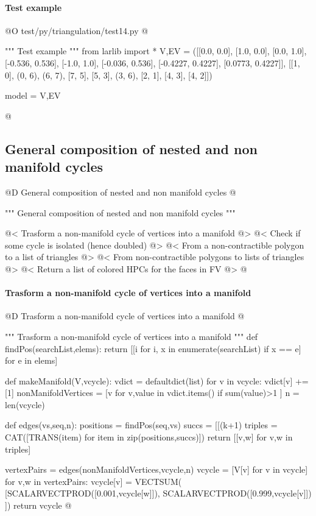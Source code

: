 \documentclass[11pt,oneside]{article}    %
\begin{document}
\paragraph{Test example}
@O test/py/triangulation/test14.py 
@{""" Test example """    
from larlib import *
V,EV = ([[0.0, 0.0],
  [1.0, 0.0],
  [0.0, 1.0],
  [-0.536, 0.536],
  [-1.0, 1.0],
  [-0.036, 0.536],
  [-0.4227, 0.4227],
  [0.0773, 0.4227]],
 [[1, 0], (0, 6), (6, 7), [7, 5], [5, 3], (3, 6), [2, 1], [4, 3], [4, 2]])
 
model = V,EV

@}




\subsection{General composition of nested and non manifold cycles}
@D General composition of nested and non manifold cycles 
@{""" General composition of nested and non manifold cycles """

@< Trasform a non-manifold cycle of vertices into a manifold  @>
@< Check if some cycle is isolated (hence doubled) @>
@< From a non-contractible polygon to a list of triangles @>
@< From non-contractible polygons to lists of triangles @>
@< Return a list of colored HPCs for the faces in FV @>
@}


\paragraph{Trasform a non-manifold cycle of vertices into a manifold}
@D Trasform a non-manifold cycle of vertices into a manifold 
@{""" Trasform a non-manifold cycle of vertices into a manifold """
def findPos(searchList,elems):
    return [[i for i, x in enumerate(searchList) if x == e] for e in elems]

def makeManifold(V,vcycle):
    vdict = defaultdict(list)
    for v in vcycle: vdict[v] += [1]
    nonManifoldVertices = [v for v,value in vdict.items() if sum(value)>1 ]
    n = len(vcycle)
    
    def edges(vs,seq,n):
        positions = findPos(seq,vs)
        succs = [[(k+1)%
        triples = CAT([TRANS(item) for item in zip(positions,succs)])
        return [[v,w] for v,w in triples]
        
    vertexPairs = edges(nonManifoldVertices,vcycle,n)
    vcycle = [V[v] for v in vcycle] 
    for v,w in vertexPairs: vcycle[v] = VECTSUM(
        [SCALARVECTPROD([0.001,vcycle[w]]),
         SCALARVECTPROD([0.999,vcycle[v]]) ])
    return vcycle
@}
\end{document}
